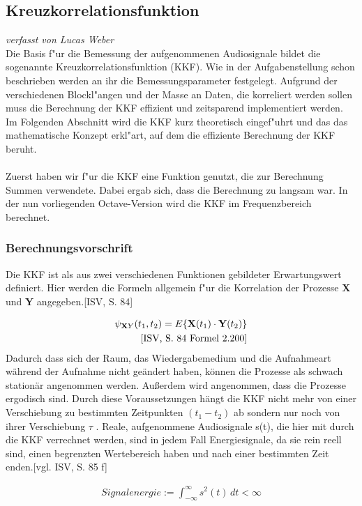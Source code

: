 \subsection{Kreuzkorrelationsfunktion}
\textit{verfasst von Lucas Weber\\}
Die Basis f"ur die Bemessung der aufgenommenen Audiosignale bildet die sogenannte Kreuzkorrelationsfunktion (KKF). Wie in der Aufgabenstellung schon beschrieben werden an ihr die Bemessungsparameter festgelegt. Aufgrund der verschiedenen Blockl"angen und der Masse an Daten, die korreliert werden sollen muss die Berechnung der KKF effizient und zeitsparend implementiert werden. Im Folgenden Abschnitt wird die KKF kurz theoretisch eingef"uhrt und das das mathematische Konzept erkl"art, auf dem die effiziente Berechnung der KKF beruht.
\\\\
Zuerst haben wir f"ur die KKF eine Funktion genutzt, die zur Berechnung Summen verwendete. Dabei ergab sich, dass die Berechnung zu langsam war. In der nun vorliegenden Octave-Version wird die KKF im Frequenzbereich berechnet.
\subsubsection{Berechnungsvorschrift}
Die KKF ist als aus zwei verschiedenen Funktionen gebildeter Erwartungswert definiert. Hier werden die Formeln allgemein f"ur die Korrelation der Prozesse \textbf{X} und \textbf{Y} angegeben.[ISV, S. 84] 

\begin{align}
\psi_{\textbf XY}(t_1, t_2) = E\lbrace\textbf{X}(t_1)\cdot\textbf{Y}(t_2)\rbrace\\\text{[ISV, S. 84 Formel 2.200]}
\end{align}
Dadurch dass sich der Raum, das Wiedergabemedium und die Aufnahmeart während der Aufnahme nicht geändert haben, können die Prozesse als schwach stationär angenommen werden. Außerdem wird angenommen, dass die Prozesse ergodisch sind. Durch diese Voraussetzungen hängt die KKF nicht mehr von einer Verschiebung zu bestimmten Zeitpunkten $(t_1 - t_2)$ ab sondern nur noch von ihrer Verschiebung $\tau$ . Reale, aufgenommene Audiosignale s(t), die hier mit durch die KKF verrechnet werden, sind in jedem Fall Energiesignale, da sie rein reell sind, einen begrenzten Wertebereich haben und nach einer bestimmten Zeit enden.[vgl. ISV, S. 85 f]

\begin{align}
Signalenergie := \int_{-\infty}^{\infty} s^2(t) \,dt < \infty
\end{align}

